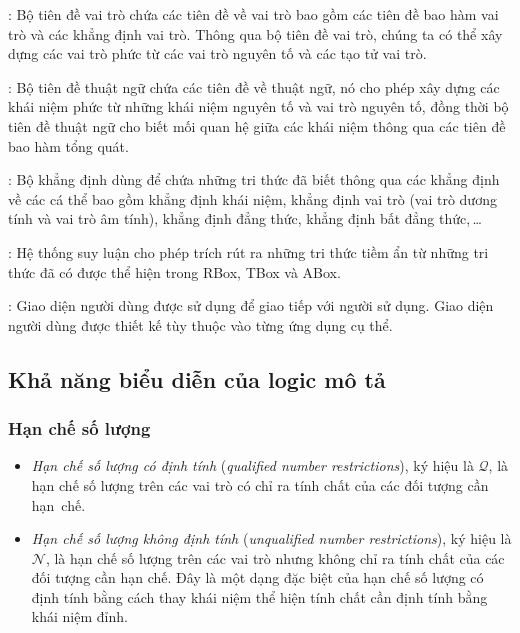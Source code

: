 : Bộ tiên đề vai trò chứa các tiên đề về vai trò bao gồm các tiên đề bao hàm vai trò và các khẳng định vai trò. Thông qua bộ tiên đề vai trò, chúng ta có thể xây dựng các vai trò phức từ các vai trò nguyên tố và các tạo tử vai trò.

: Bộ tiên đề thuật ngữ chứa các tiên đề về thuật ngữ, nó cho phép xây dựng các khái niệm phức từ những khái niệm nguyên tố và vai trò nguyên tố, đồng thời bộ tiên đề thuật ngữ cho biết mối quan hệ giữa các khái niệm thông qua các tiên đề bao hàm tổng quát.

: Bộ khẳng định dùng để chứa những tri thức đã biết thông qua các khẳng định về các cá thể bao gồm khẳng định khái niệm, khẳng định vai trò (vai trò dương tính và vai trò âm tính), khẳng định đẳng thức, khẳng định bất đẳng thức,\,\ldots

: Hệ thống suy luận cho phép trích rút ra những tri thức tiềm ẩn từ những tri thức đã có được thể hiện trong RBox, TBox và ABox.
	
: Giao diện người dùng được sử dụng để giao tiếp với người sử dụng. Giao diện người dùng được thiết kế tùy thuộc vào từng ứng dụng cụ thể.  

\subsection{Khả năng biểu diễn của logic mô tả}
\label{sec:Chap1.Expressiveness}
\subsubsection{Hạn chế số lượng}
\label{sec:Chap1.NumberRestrictions}
\begin{itemize}
	\item {\em Hạn chế số lượng có định tính} ({\em qualified number restrictions}), ký hiệu là $\mathcal{Q}$, là hạn chế số lượng trên các vai trò có chỉ ra tính chất của các đối tượng cần hạn~chế.
	
	\item {\em Hạn chế số lượng không định tính} ({\em unqualified number restrictions}), ký hiệu là $\mathcal{N}$, là hạn chế số lượng trên các vai trò nhưng không chỉ ra tính chất của các đối tượng cần hạn chế. Đây là một dạng đặc biệt của hạn chế số lượng có định tính bằng cách thay khái niệm thể hiện tính chất cần định tính bằng khái niệm đỉnh.
\end{itemize}

